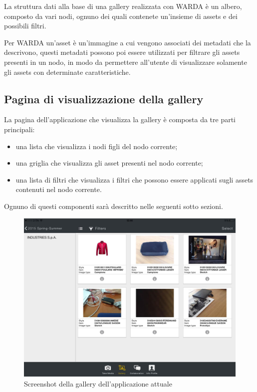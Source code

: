 La struttura dati alla base di una gallery realizzata con WARDA è un albero, composto da vari nodi, ognuno dei quali contenete un'insieme di assets e dei possibili filtri.

Per WARDA un'asset è un'immagine a cui vengono associati dei metadati che la descrivono, questi metadati possono poi essere utilizzati per filtrare gli assets presenti in un nodo, in modo da permettere all'utente di visualizzare solamente gli assets con determinate caratteristiche.

\subsection{Pagina di visualizzazione della gallery}

La pagina dell'applicazione che visualizza la gallery è composta da tre parti principali:
\begin{itemize}
\item una lista che visualizza i nodi figli del nodo corrente;
\item una griglia che visualizza gli asset presenti nel nodo corrente;
\item una lista di filtri che visualizza i filtri che possono essere applicati sugli assets contenuti nel nodo corrente.
\end{itemize}
Ognuno di questi componenti sarà descritto nelle seguenti sotto sezioni.

\begin{figure}[htp]
\centering
\includegraphics[width=\textwidth]{../immagini/warda-gallery}
\caption{Screenshot della gallery dell'applicazione attuale}  
\end{figure}

